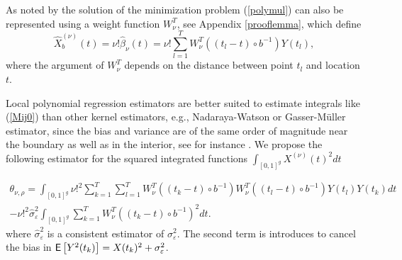 As noted by \cite{Fan1995} the solution of the minimization problem (\ref{polymul}) can also be represented using a weight function $W^T_\nu$, see Appendix \ref{prooflemma}, which define%
\begin{equation}\label{polyeqkern}
\hat{X}_b^{(\nu)}(t)= \nu! \hat{\beta}_{\nu}(t) = \nu!\sum_{l=1}^{T} W^T_\nu  \left((t_{l}-t)\circ b^{-1} \right) Y(t_{l}),
\end{equation}
where the argument of $W^T_\nu$ depends on the distance between point $t_l$ and location $t$.%






Local polynomial regression estimators are better suited to estimate integrals like (\ref{Mij0}) than other kernel estimators, e.g., Nadaraya-Watson or Gasser-M{\"u}ller estimator, since the bias and variance are of the same order of magnitude near the boundary as well as in the interior, see for instance \cite{FanGijbels92}. %
We propose the following estimator for the squared integrated functions $\int_{[0,1]^g} X^{(\nu)}(t)^2 dt$

\begin{equation}\label{rho}
\begin{split}
\theta_{\nu,\rho}= \int_{[0,1]^g} \nu!^2  \sum_{k=1}^{T} \sum_{l=1}^{T} W^T_\nu\left((t_{k}-t)\circ b^{-1} \right)  W^T_\nu\left((t_{l}-t)\circ b^{-1} \right) Y(t_{l}) Y(t_{k}) dt
\\ -  \nu!^2 \hat{\sigma}_{\varepsilon}^2 \int_{[0,1]^g} \sum_{k=1}^{T} W^T_\nu\left((t_{k}-t)\circ b^{-1} \right)^2  dt.
\end{split}
\end{equation}
where $\hat{\sigma}_{\varepsilon}^2$ is a consistent estimator of $\sigma_{\varepsilon}^2$. The second term is introduces to cancel the bias in $\mathop{\mbox{\sf E}}\left[Y^2(t_{k}) \right] = X (t_{k})^2 +\sigma_{\varepsilon}^2$. %

